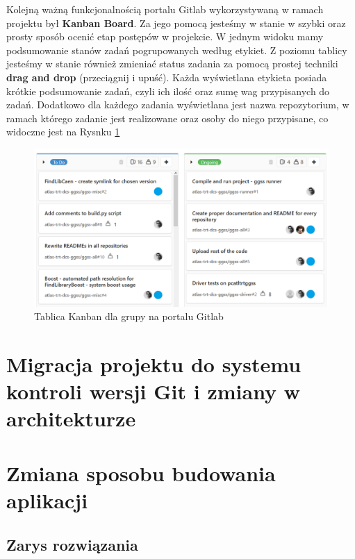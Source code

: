 \newpage

Kolejną ważną funkcjonalnością portalu Gitlab wykorzystywaną w ramach projektu był \textbf{Kanban Board}. Za jego pomocą jesteśmy w stanie w szybki oraz prosty sposób ocenić etap postępów w projekcie. W jednym widoku mamy podsumowanie stanów zadań pogrupowanych według etykiet. Z poziomu tablicy jesteśmy w stanie również zmieniać status zadania za pomocą prostej techniki \textbf{drag and drop} (przeciągnij i upuść). Każda wyświetlana etykieta posiada krótkie podsumowanie zadań, czyli ich ilość oraz sumę wag przypisanych do zadań. Dodatkowo dla każdego zadania wyświetlana jest nazwa repozytorium, w ramach którego zadanie jest realizowane oraz osoby do niego przypisane, co widoczne jest na Rysnku \ref{fig:kanban}

\begin{figure}[H]
\centering
\caption{Tablica Kanban dla grupy na portalu Gitlab}
\label{fig:kanban}
\includegraphics[width=\textwidth]{res/png/kanban}
\end{figure}

\newpage
\section{Migracja projektu do systemu kontroli wersji Git i zmiany w architekturze}


\newpage
\section{Zmiana sposobu budowania aplikacji}

\subsection{Zarys rozwiązania} %

